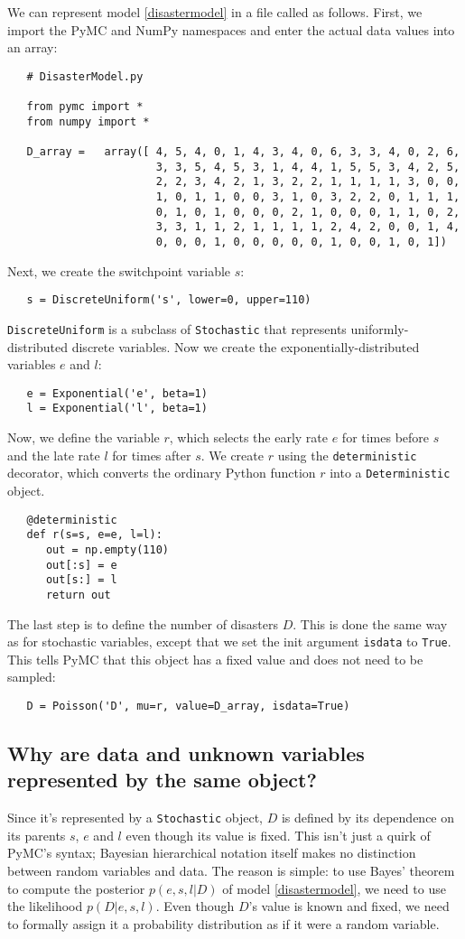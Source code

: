 We can represent model \ref{disastermodel} in a file called  as follows. First, we import the PyMC and NumPy namespaces and enter the actual data values into an array:
\begin{verbatim}
   # DisasterModel.py
   
   from pymc import *
   from numpy import *

   D_array =   array([ 4, 5, 4, 0, 1, 4, 3, 4, 0, 6, 3, 3, 4, 0, 2, 6,
                       3, 3, 5, 4, 5, 3, 1, 4, 4, 1, 5, 5, 3, 4, 2, 5,
                       2, 2, 3, 4, 2, 1, 3, 2, 2, 1, 1, 1, 1, 3, 0, 0,
                       1, 0, 1, 1, 0, 0, 3, 1, 0, 3, 2, 2, 0, 1, 1, 1,
                       0, 1, 0, 1, 0, 0, 0, 2, 1, 0, 0, 0, 1, 1, 0, 2,
                       3, 3, 1, 1, 2, 1, 1, 1, 1, 2, 4, 2, 0, 0, 1, 4,
                       0, 0, 0, 1, 0, 0, 0, 0, 0, 1, 0, 0, 1, 0, 1])
\end{verbatim} 
Next, we create the switchpoint variable $s$:
\begin{verbatim}
   s = DiscreteUniform('s', lower=0, upper=110)   
\end{verbatim}
\texttt{DiscreteUniform} is a subclass of \texttt{Stochastic} that represents uniformly-distributed discrete variables. Now we create the exponentially-distributed variables $e$ and $l$:
\begin{verbatim}
   e = Exponential('e', beta=1)
   l = Exponential('l', beta=1)   
\end{verbatim}
Now, we define the variable $r$, which selects the early rate $e$ for times before $s$ and the late rate $l$ for times after $s$. We create $r$ using the \texttt{deterministic} decorator, which converts the ordinary Python function $r$ into a \texttt{Deterministic} object.
\begin{verbatim}
   @deterministic
   def r(s=s, e=e, l=l):
      out = np.empty(110)
      out[:s] = e
      out[s:] = l
      return out
\end{verbatim}
The last step is to define the number of disasters $D$. This is done the same way as for stochastic variables, except that we set the init argument \texttt{isdata} to \texttt{True}. This tells PyMC that this object has a fixed value and does not need to be sampled:
\begin{verbatim}
   D = Poisson('D', mu=r, value=D_array, isdata=True)
\end{verbatim}

\subsection*{Why are data and unknown variables represented by the same object?}
Since it's represented by a \texttt{Stochastic} object, $D$ is defined by its dependence on its parents $s$, $e$ and $l$ even though its value is fixed. This isn't just a quirk of PyMC's syntax; Bayesian hierarchical notation itself makes no distinction between random variables and data. The reason is simple: to use Bayes' theorem to compute the posterior $p(e,s,l|D)$ of model \ref{disastermodel}, we need to use the likelihood $p(D|e,s,l)$. Even though $D$'s value is known and fixed, we need to formally assign it a probability distribution as if it were a random variable.

